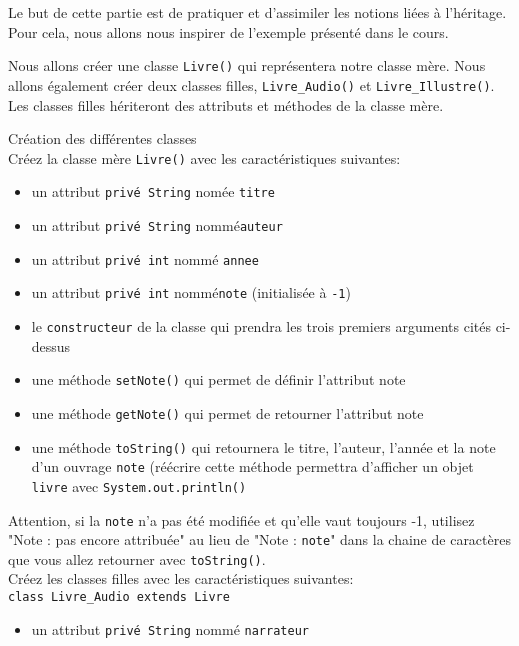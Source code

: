 
Le but de cette partie est de pratiquer et d'assimiler les notions liées à l'héritage. Pour cela, nous allons nous inspirer de l'exemple présenté dans le cours. 

Nous allons créer une classe \lstinline{Livre()} qui représentera notre classe mère. Nous allons également créer deux classes filles, \lstinline{Livre_Audio()} et \lstinline{Livre_Illustre()}. Les classes filles hériteront des attributs et méthodes de la classe mère. 

\begin{Exercice}[10 minutes] Création des différentes classes\\

Créez la classe mère \lstinline{Livre()} avec les caractéristiques suivantes:
\begin{itemize}
	\item un attribut \lstinline{privé String} nomée \lstinline{titre}
	\item un attribut \lstinline{privé String} nommé\lstinline{auteur}
	\item un attribut \lstinline{privé int} nommé \lstinline{annee}
	\item un attribut \lstinline{privé int} nommé\lstinline{note} (initialisée à \lstinline{-1})
	\item le \lstinline{constructeur} de la classe qui prendra les trois premiers arguments cités ci-dessus
	\item une méthode \lstinline{setNote()} qui permet de définir l'attribut note
	\item une méthode \lstinline{getNote()} qui permet de retourner l'attribut note
	\item une méthode \lstinline{toString()} qui retournera le titre, l'auteur, l'année et la note d'un ouvrage \lstinline{note} (réécrire cette méthode permettra d'afficher un objet \lstinline{livre} avec \lstinline{System.out.println()} \\
\end{itemize}

Attention, si la \lstinline{note} n'a pas été modifiée et qu'elle vaut toujours -1, utilisez "Note : pas encore attribuée" au lieu de "Note : \lstinline{note}" dans la chaine de caractères que vous allez retourner avec \lstinline{toString()}. \\


Créez les classes filles avec les caractéristiques suivantes:\\
\lstinline{class Livre_Audio extends Livre}
\begin{itemize}
	\item un attribut \lstinline{privé String} nommé \lstinline{narrateur}


\end{itemize}
\end{Exercice}
